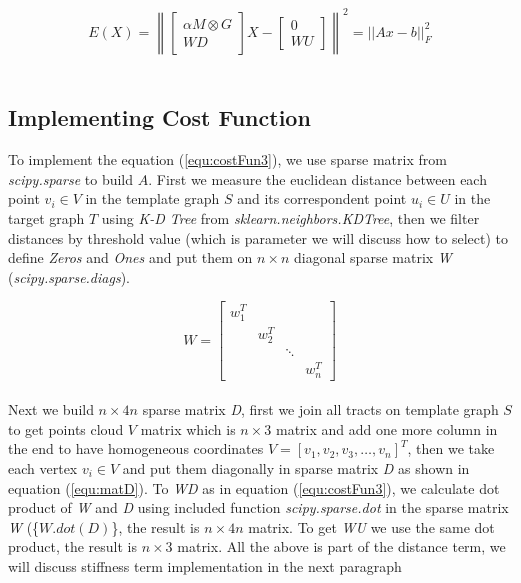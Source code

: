 \documentclass[../structure.tex]{subfiles}
\begin{document}
\begin{equation}
E(X) = \left\|
\begin{bmatrix}
\alpha M \otimes G \\ WD
\end{bmatrix}
X -
\begin{bmatrix}
0 \\ WU
\end{bmatrix}
\right\| ^2 
= ||Ax - b||_{F}^2
\label{equ:costFun3}
\end{equation}\\

\subsection{Implementing Cost Function}
\hspace{2em}To implement the equation (\ref{equ:costFun3}), we use sparse matrix from \textit{scipy.sparse} to build $A$. First we measure the euclidean distance between each point $v_{i}\in V$ in the template graph $S$ and its correspondent point $u_{i}\in U$ in the target graph $T$ using \textit{K-D Tree} from \textit{sklearn.neighbors.KDTree}, then we filter distances by threshold value (which is parameter we will discuss how to select) to define \textit{Zeros} and \textit{Ones} and put them on $n\times n$ diagonal sparse matrix \textit{W} (\textit{scipy.sparse.diags}).

\begin{equation*}
W =
\begin{bmatrix}
w_{1}^T & & & \\
& w_{2}^T & & \\
& & \ddots & \\
& & & w_{n}^T
\end{bmatrix}
\end{equation*}\\

Next we build $n\times 4n$ sparse matrix \textit{D}, first we join all tracts on template graph $S$ to get points cloud $V$ matrix which is $n\times 3$ matrix and add one more column in the end to have homogeneous coordinates $V=[v_{1}, v_{2}, v_{3}, \dots , v_{n}]^T$, then we take each vertex $v_{i} \in V$ and put them diagonally in sparse matrix \textit{D} as shown in equation (\ref{equ:matD}). To \textit{WD} as in equation (\ref{equ:costFun3}), we calculate dot product of \textit{W} and \textit{D} using included function \textit{scipy.sparse.dot} in the sparse matrix \textit{W} (\{$W.dot(D)$\}, the result is $n\times 4n$ matrix. To get \textit{WU} we use the same dot product, the result is $n\times 3$ matrix. All the above is part of the distance term, we will discuss stiffness term implementation in the next paragraph
\end{document}
